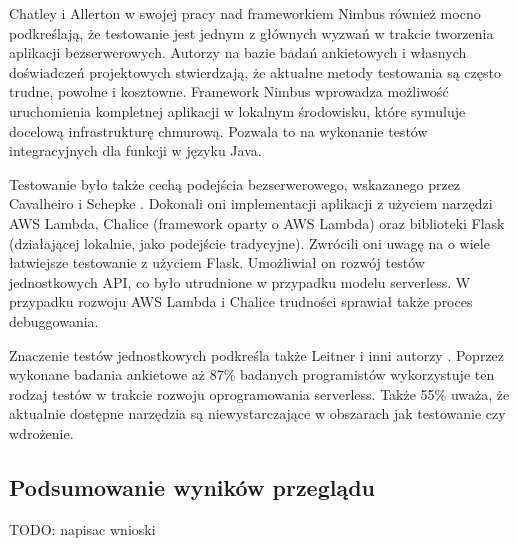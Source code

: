 Chatley i Allerton \cite{10.1145/3377812.3382135} w swojej pracy nad frameworkiem Nimbus również mocno podkreślają, że testowanie jest jednym z głównych wyzwań w trakcie tworzenia aplikacji bezserwerowych.
Autorzy na bazie badań ankietowych i własnych doświadczeń projektowych stwierdzają, że aktualne metody testowania są często trudne, powolne i kosztowne.
Framework Nimbus wprowadza możliwość uruchomienia kompletnej aplikacji w lokalnym środowisku, które symuluje docelową infrastrukturę chmurową.
Pozwala to na wykonanie testów integracyjnych dla funkcji w języku Java.

Testowanie było także cechą podejścia bezserwerowego, wskazanego przez Cavalheiro i Schepke \cite{Cavalheiro202389}.
Dokonali oni implementacji aplikacji z użyciem narzędzi AWS Lambda, Chalice (framework oparty o AWS Lambda) oraz biblioteki Flask (działającej lokalnie, jako podejście tradycyjne).
Zwrócili oni uwagę na o wiele łatwiejsze testowanie z użyciem Flask. 
Umożliwiał on rozwój testów jednostkowych API, co było utrudnione w przypadku modelu serverless.
W przypadku rozwoju AWS Lambda i Chalice trudności sprawiał także proces debuggowania.

Znaczenie testów jednostkowych podkreśla także Leitner i inni autorzy \cite{LEITNER2019340}.
Poprzez wykonane badania ankietowe aż 87\% badanych programistów wykorzystuje ten rodzaj testów w trakcie rozwoju oprogramowania serverless.
Także 55\% uważa, że aktualnie dostępne narzędzia są niewystarczające w obszarach jak testowanie czy wdrożenie.

\subsection{Podsumowanie wyników przeglądu}\label{chapter:przeglad_literatury_wyniki_podsumowanie}

TODO: napisac wnioski
